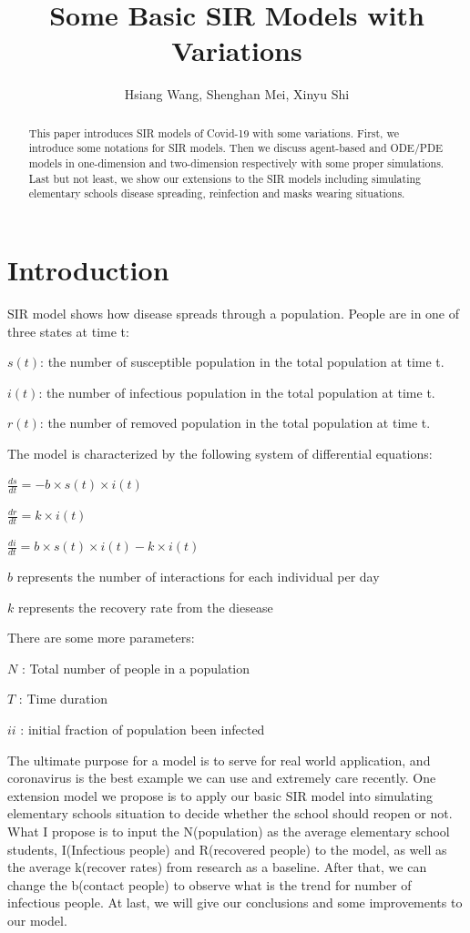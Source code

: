 \documentclass[11pt,a4paper]{article}
\title{Some Basic SIR Models with Variations}
\author{Hsiang Wang, Shenghan Mei, Xinyu Shi}
\begin{document}
\maketitle


\begin{abstract}


\noindent	
 This paper introduces SIR models of Covid-19 with some variations. First, we introduce some notations for SIR models. Then we discuss agent-based and ODE/PDE models in one-dimension and two-dimension respectively with some proper simulations. Last but not least, we show our extensions to the SIR models including simulating elementary schools disease spreading, reinfection and masks wearing situations. 

\end{abstract}

\section*{Introduction}

   SIR model shows how disease spreads through a population. People are in one of three states at time t:

$s(t)$: the number of susceptible population in the total population at time t.

$i(t)$: the number of infectious population in the total population at time t.

$r(t)$: the number of removed population in the total population at time t.

The model is characterized by the following system of differential equations:

$\frac{ds}{dt} = -b \times s(t) \times i(t)$

$\frac{dr}{dt} = k \times i(t)$

$\frac{di}{dt} = b \times s(t) \times i(t) - k \times i(t)$

$b$ represents the number of interactions for each individual per day 

$k$ represents the recovery rate from the diesease

There are some more parameters:

$N$ : Total number of people in a population

$T$ : Time duration

$ii$ : initial fraction of population been infected

\medskip \noindent
The ultimate purpose for a model is to serve for real world application, and coronavirus is the best example we can use and extremely care recently. One extension model we propose is to apply our basic SIR model into simulating elementary schools situation to decide whether the school should reopen or not. What I propose is to input the N(population) as the average elementary school students, I(Infectious people) and R(recovered people) to the model, as well as the average k(recover rates) from research as a baseline. After that, we can change the b(contact people) to observe what is the trend for number of infectious people. At last, we will give our conclusions and some improvements to our model. 
\end{document}

